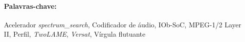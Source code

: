 \paragraph{\hspace{0.5cm} \Large{Palavras-chave:}} Acelerador \textit{spectrum\_search}, Codificador de áudio, IOb-SoC, MPEG-1/2 Layer II, Perfil, \textit{TwoLAME}, \textit{Versat}, Vírgula flutuante